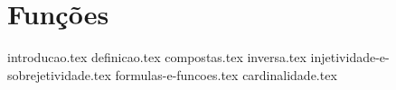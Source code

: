 \chapter{Funções}
{
    \newcommand{\chapterdir}{./sections/}
    
    {introducao.tex}
    {definicao.tex}
    {compostas.tex}
    {inversa.tex}
    {injetividade-e-sobrejetividade.tex}
    {formulas-e-funcoes.tex}
    {cardinalidade.tex}
}